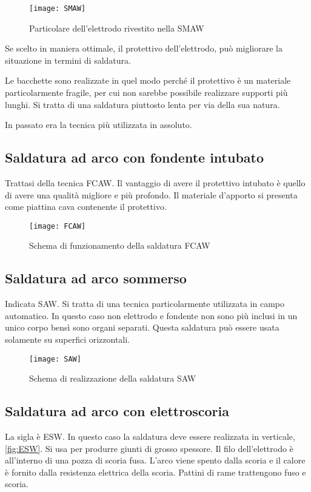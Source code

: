 \begin{figure}
\centering
\texttt{[image: SMAW]}
\caption{Particolare dell'elettrodo rivestito nella \ac{SMAW}}
\label{fig:SMAW}
\end{figure}

Se scelto in maniera ottimale, il protettivo dell'elettrodo, può migliorare la situazione in termini di saldatura.

Le bacchette sono realizzate in quel modo perché il protettivo è un materiale particolarmente fragile, per cui non sarebbe possibile realizzare supporti più lunghi.
Si tratta di una saldatura piuttosto lenta per via della sua natura.

In passato era la tecnica più utilizzata in assoluto.

\subsection{Saldatura ad arco con fondente intubato}
Trattasi della tecnica \ac{FCAW}.
Il vantaggio di avere il protettivo intubato è quello di avere una qualità migliore e più profondo. Il materiale d'apporto si presenta come piattina cava contenente il protettivo.

\begin{figure}
\centering
\texttt{[image: FCAW]}
\caption{Schema di funzionamento della saldatura \ac{FCAW}}
\label{fig:FCAW}
\end{figure}

\subsection{Saldatura ad arco sommerso}
Indicata \ac{SAW}.
Si tratta di una tecnica particolarmente utilizzata in campo automatico.
In questo caso non elettrodo e fondente non sono più inclusi in un unico corpo bensì sono organi separati.
Questa saldatura può essere usata solamente su superfici orizzontali.

\begin{figure}
\centering
\texttt{[image: SAW]}
\caption{Schema di realizzazione della saldatura \ac{SAW}}
\label{fig:SAW}
\end{figure}


\subsection{Saldatura ad arco con elettroscoria}
La sigla è \ac{ESW}.
In questo caso la saldatura deve essere realizzata in verticale, \ref{fig:ESW}.
Si usa per produrre giunti di grosso spessore.
Il filo dell'elettrodo è all'interno di una pozza di scoria fusa.
L'arco viene spento dalla scoria e il calore è fornito dalla resistenza elettrica della scoria.
Pattini di rame trattengono fuso e scoria.

